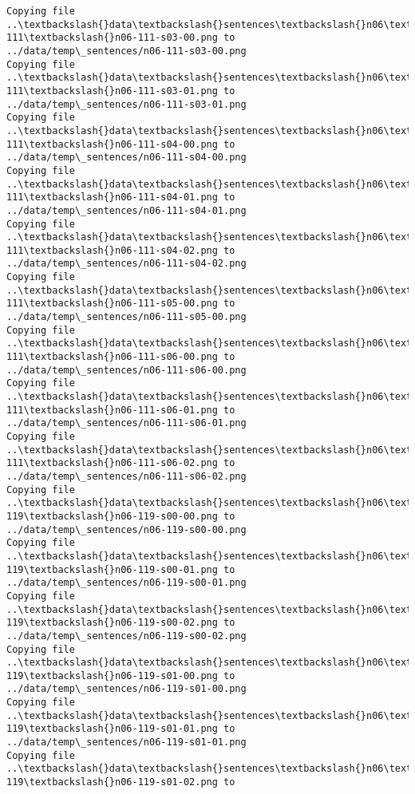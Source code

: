 \documentclass[11pt]{article}
\begin{document}
\begin{Verbatim}[commandchars=\\\{\}]
Copying file ..\textbackslash{}data\textbackslash{}sentences\textbackslash{}n06\textbackslash{}n06-111\textbackslash{}n06-111-s03-00.png to
../data/temp\_sentences/n06-111-s03-00.png
Copying file ..\textbackslash{}data\textbackslash{}sentences\textbackslash{}n06\textbackslash{}n06-111\textbackslash{}n06-111-s03-01.png to
../data/temp\_sentences/n06-111-s03-01.png
Copying file ..\textbackslash{}data\textbackslash{}sentences\textbackslash{}n06\textbackslash{}n06-111\textbackslash{}n06-111-s04-00.png to
../data/temp\_sentences/n06-111-s04-00.png
Copying file ..\textbackslash{}data\textbackslash{}sentences\textbackslash{}n06\textbackslash{}n06-111\textbackslash{}n06-111-s04-01.png to
../data/temp\_sentences/n06-111-s04-01.png
Copying file ..\textbackslash{}data\textbackslash{}sentences\textbackslash{}n06\textbackslash{}n06-111\textbackslash{}n06-111-s04-02.png to
../data/temp\_sentences/n06-111-s04-02.png
Copying file ..\textbackslash{}data\textbackslash{}sentences\textbackslash{}n06\textbackslash{}n06-111\textbackslash{}n06-111-s05-00.png to
../data/temp\_sentences/n06-111-s05-00.png
Copying file ..\textbackslash{}data\textbackslash{}sentences\textbackslash{}n06\textbackslash{}n06-111\textbackslash{}n06-111-s06-00.png to
../data/temp\_sentences/n06-111-s06-00.png
Copying file ..\textbackslash{}data\textbackslash{}sentences\textbackslash{}n06\textbackslash{}n06-111\textbackslash{}n06-111-s06-01.png to
../data/temp\_sentences/n06-111-s06-01.png
Copying file ..\textbackslash{}data\textbackslash{}sentences\textbackslash{}n06\textbackslash{}n06-111\textbackslash{}n06-111-s06-02.png to
../data/temp\_sentences/n06-111-s06-02.png
Copying file ..\textbackslash{}data\textbackslash{}sentences\textbackslash{}n06\textbackslash{}n06-119\textbackslash{}n06-119-s00-00.png to
../data/temp\_sentences/n06-119-s00-00.png
Copying file ..\textbackslash{}data\textbackslash{}sentences\textbackslash{}n06\textbackslash{}n06-119\textbackslash{}n06-119-s00-01.png to
../data/temp\_sentences/n06-119-s00-01.png
Copying file ..\textbackslash{}data\textbackslash{}sentences\textbackslash{}n06\textbackslash{}n06-119\textbackslash{}n06-119-s00-02.png to
../data/temp\_sentences/n06-119-s00-02.png
Copying file ..\textbackslash{}data\textbackslash{}sentences\textbackslash{}n06\textbackslash{}n06-119\textbackslash{}n06-119-s01-00.png to
../data/temp\_sentences/n06-119-s01-00.png
Copying file ..\textbackslash{}data\textbackslash{}sentences\textbackslash{}n06\textbackslash{}n06-119\textbackslash{}n06-119-s01-01.png to
../data/temp\_sentences/n06-119-s01-01.png
Copying file ..\textbackslash{}data\textbackslash{}sentences\textbackslash{}n06\textbackslash{}n06-119\textbackslash{}n06-119-s01-02.png to

\end{Verbatim}
\end{document}

